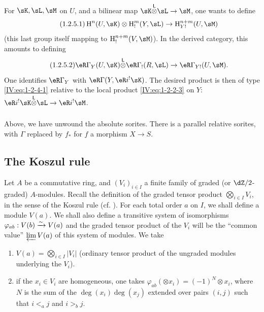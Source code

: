 For $\sK,\sL,\sM$ on $U$, and a bilinear map
$\sK\lotimes\sL\to\sM$, one wants to define
\begin{equation*}\tag{1.2.5.1}\label{IV:eq:1-2-5-1}
  \h^n(U,\sK)\otimes \h_!^m(Y,\sL) \to \h_{Y!}^{n+m}(U,\sM)
\end{equation*}
(this last group itself mapping to $\h_!^{n+m}(V,\sM)$). In the
derived category, this amounts to defining
\begin{equation*}\tag{1.2.5.2}\label{IV:eq:1-2-5-2}
  \eR\Gamma_Y(U,\sK) \lotimes \eR\Gamma_!(R,\sL) \to \eR\Gamma_{Y!}(U,\sM) \text{.}
\end{equation*}
One identifies $\eR\Gamma_Y$ with $\eR\Gamma(Y,\eR i^!\sK)$. The desired product
is then of type \eqref{IV:eq:1-2-4-1} relative to the local product
\eqref{IV:eq:1-2-2-3} on $Y$: $\eR i^! \sK\lotimes\sL \to \eR i^! \sM$.




\subsubsection{}\label{IV:1-2-6}

Above, we have unwound the absolute sorites. There is a parallel relative
sorites, with $\Gamma$ replaced by $f_*$ for $f$ a morphism $X\to S$.










\subsection{The Koszul rule}\label{IV:1-3}

Let $A$ be a commutative ring, and $(V_i)_{i\in I}$ a finite family of
graded (or $\dZ/2$-graded) $A$-modules. Recall the definition of the
graded tensor product $\bigotimes_{i\in I} V_i$, in the sense of the
Koszul rule (cf. \cite[XVII 1.1]{sga4}). For each total order $a$ on $I$, we
shall define a module $V(a)$. We shall also define a transitive system
of isomorphisms $\varphi_{a b}:V(b)\xrightarrow\sim V(a)$ and the graded
tensor product of the $V_i$ will be the ``common value'' $\varprojlim V(a)$ of this
system of modules. We take
\begin{enumerate}[\indent a)]
  \item $V(a) = \bigotimes_{i\in I} |V_i|$ (ordinary tensor product of the
    ungraded modules underlying the $V_i$).
  \item if the $x_i\in V_i$ are homogeneous, one takes
    $\varphi_{a b}(\otimes x_i) = (-1)^N \otimes x_i$, where $N$ is the sum
    of the $\deg(x_i)\deg(x_j)$ extended over pairs $(i,j)$ such that
    $i<_a j$ and $i>_b j$.
\end{enumerate}




